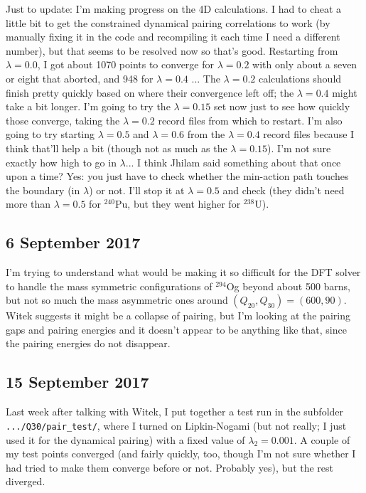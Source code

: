 \documentclass[]{report}
\begin{document}
Just to update: I'm making progress on the 4D calculations. I had to cheat a little bit to get the constrained dynamical pairing correlations to work (by manually fixing it in the code and recompiling it each time I need a different number), but that seems to be resolved now so that's good. Restarting from $\lambda=0.0$, I got about 1070 points to converge for $\lambda=0.2$ with only about a seven or eight that aborted, and 948 for $\lambda=0.4$ ... The $\lambda=0.2$ calculations should finish pretty quickly based on where their convergence left off; the $\lambda=0.4$ might take a bit longer. I'm going to try the $\lambda=0.15$ set now just to see how quickly those converge, taking the $\lambda=0.2$ record files from which to restart. I'm also going to try starting $\lambda=0.5$ and $\lambda=0.6$ from the $\lambda=0.4$ record files because I think that'll help a bit (though not as much as the $\lambda=0.15$). I'm not sure exactly how high to go in $\lambda$... I think Jhilam said something about that once upon a time? Yes: you just have to check whether the min-action path touches the boundary (in $\lambda$) or not. I'll stop it at $\lambda=0.5$ and check (they didn't need more than $\lambda=0.5$ for $^{240}$Pu, but they went higher for $^{238}$U).

\subsection*{6 September 2017}
I'm trying to understand what would be making it so difficult for the DFT solver to handle the mass symmetric configurations of $^{294}$Og beyond about 500 barns, but not so much the mass asymmetric ones around $(Q_{20},Q_{30})=(600, 90)$. Witek suggests it might be a collapse of pairing, but I'm looking at the pairing gaps and pairing energies and it doesn't appear to be anything like that, since the pairing energies do not disappear. 

\subsection*{15 September 2017}
Last week after talking with Witek, I put together a test run in the subfolder \texttt{.../Q30/pair\_test/}, where I turned on Lipkin-Nogami (but not really; I just used it for the dynamical pairing) with a fixed value of $\lambda_2=0.001$. A couple of my test points converged (and fairly quickly, too, though I'm not sure whether I had tried to make them converge before or not. Probably yes), but the rest diverged.
\end{document}
